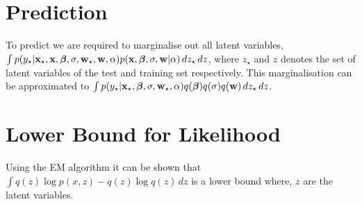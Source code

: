 \documentclass{article}
\begin{document}

\section{Prediction}
To predict we are required to marginalise out all latent variables, $\int p(y_\star|\mathbf{x}_\star,\mathbf{x},\bm{\beta},\sigma,\mathbf{w}_\star,\mathbf{w},\alpha)p(\mathbf{x},\bm{\beta},\sigma,\mathbf{w}|\alpha)\,dz_\star\,dz$, where $z_\star$ and $z$ denotes the set of latent variables of the test and training set respectively. This marginalisation can be approximated to  $\int p(y_\star|\mathbf{x}_\star,\bm{\beta},\sigma,\mathbf{w}_\star,\alpha)q(\bm{\beta})q(\sigma)q(\mathbf{w})\,dz_\star\,dz$.

\pagebreak
\section{Lower Bound for Likelihood}
Using the EM algorithm it can be shown that $\int q(z)\log p(x,z)-q(z)\log q(z)\,dz$ is a lower bound where, $z$ are the latent variables.
\end{document}
